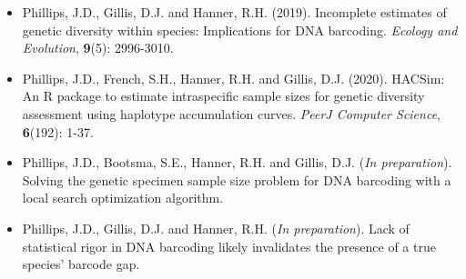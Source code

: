 \begin{itemize}

\item Phillips, J.D., Gillis, D.J. and Hanner, R.H. (2019). Incomplete estimates of genetic diversity within species: Implications for DNA barcoding. \textit{Ecology and Evolution}, \textbf{9}(5): 2996-3010. 

\vspace{1mm}

\item Phillips, J.D., French, S.H., Hanner, R.H. and Gillis, D.J. (2020). HACSim: An R package to estimate intraspecific sample sizes for genetic diversity assessment using haplotype accumulation curves. \textit{PeerJ Computer Science}, \textbf{6}(192): 1-37.

\vspace{1mm}

\item Phillips, J.D., Bootsma, S.E., Hanner, R.H. and Gillis, D.J. (\textit{In preparation}). \\ Solving the genetic specimen sample size problem for DNA barcoding with a local search optimization algorithm.

\vspace{1mm}

\item Phillips, J.D., Gillis, D.J. and Hanner, R.H. (\textit{In preparation}). Lack of statistical rigor in DNA barcoding likely invalidates the presence of a true species' barcode gap.

\end{itemize} 